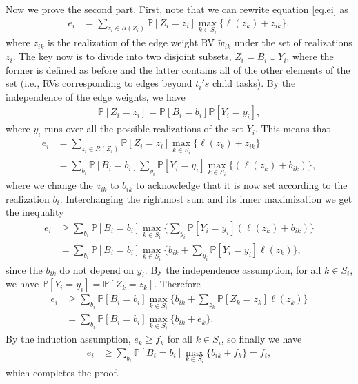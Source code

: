 \documentclass[12pt]{article}
\def\P{\mathbb{P}}
\begin{document}
Now we prove the second part. First, note that we can rewrite equation \eqref{eq.ei} as 
\begin{align*}
e_i &= \sum_{z_i \in R(Z_i)} \P[Z_i = z_i] \max_{k \in S_i} \{ \ell(z_{k}) + z_{ik} \},
\end{align*}
where $z_{ik}$ is the realization of the edge weight RV $\tilde{w}_{ik}$ under the set of realizations $z_i$. The key now is to divide into two disjoint subsets, $Z_i = B_i \cup Y_i$, where the former is defined as before and the latter contains all of the other elements of the set (i.e., RVs corresponding to edges beyond $t_i's$ child tasks). By the independence of the edge weights, we have
\begin{align*}
\P[Z_i = z_i] = \P[B_i = b_i] \P[Y_i = y_i],
\end{align*}
where $y_i$ runs over all the possible realizations of the set $Y_i$. This means that 
\begin{align*}
e_i &= \sum_{z_i \in R(Z_i)} \P[Z_i = z_i] \max_{k \in S_i} \{ \ell(z_{k}) + z_{ik} \} \\
&= \sum_{b_i} \P[B_i = b_i] \sum_{y_i} \P[Y_i = y_i]\max_{k \in S_i} \{ (\ell(z_{k}) + b_{ik}) \},
\end{align*}
where we change the $z_{ik}$ to $b_{ik}$ to acknowledge that it is now set according to the realization $b_i$. 
Interchanging the rightmost sum and its inner maximization we get the inequality
\begin{align*}
e_i &\geq \sum_{b_i} \P[B_i = b_i] \max_{k \in S_i}  \bigg \{ \sum_{y_i} \P[Y_i = y_i] (\ell(z_{k}) + b_{ik} ) \bigg \} \\
&= \sum_{b_i} \P[B_i = b_i] \max_{k \in S_i} \bigg \{ b_{ik} + \sum_{y_i} \P[Y_i = y_i] \ell(z_{k}) \bigg \},
\end{align*}
since the $b_{ik}$ do not depend on $y_i$. By the independence assumption, for all $k \in S_i$, we have $\P[Y_i = y_i] = \P[Z_k = z_k]$. Therefore 
\begin{align*}
e_i &\geq \sum_{b_i} \P[B_i = b_i] \max_{k \in S_i} \bigg \{ b_{ik} + \sum_{z_k} \P[Z_k = z_k] \ell(z_{k}) \bigg \} \\
&= \sum_{b_i} \P[B_i = b_i] \max_{k \in S_i} \{ b_{ik} + e_k \}.
\end{align*}
By the induction assumption, $e_k \geq f_k$ for all $k \in S_i$, so finally we have
\begin{align*}
e_i &\geq \sum_{b_i} \P[B_i = b_i] \max_{k \in S_i} \{ b_{ik} + f_k \} = f_i,
\end{align*}
which completes the proof.
\end{document}
